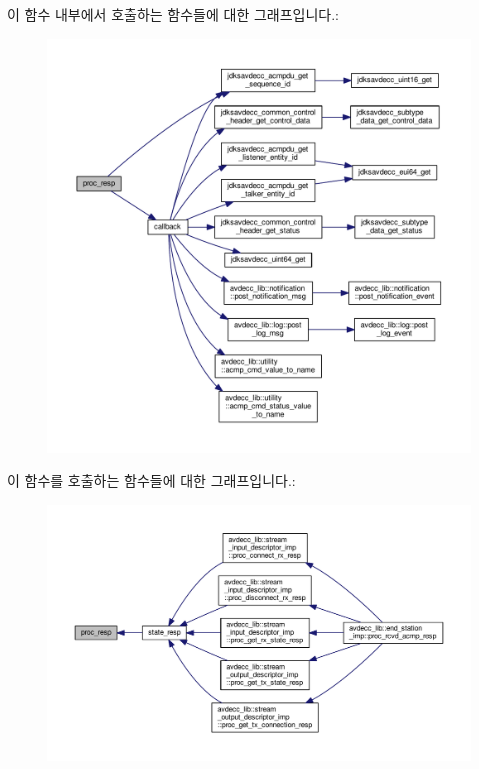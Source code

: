 이 함수 내부에서 호출하는 함수들에 대한 그래프입니다.\+:
\nopagebreak
\begin{figure}[H]
\begin{center}
\leavevmode
\includegraphics[width=350pt]{classavdecc__lib_1_1acmp__controller__state__machine_a81d345252361d6b1650316379916ccf6_cgraph}
\end{center}
\end{figure}




이 함수를 호출하는 함수들에 대한 그래프입니다.\+:
\nopagebreak
\begin{figure}[H]
\begin{center}
\leavevmode
\includegraphics[width=350pt]{classavdecc__lib_1_1acmp__controller__state__machine_a81d345252361d6b1650316379916ccf6_icgraph}
\end{center}
\end{figure}


